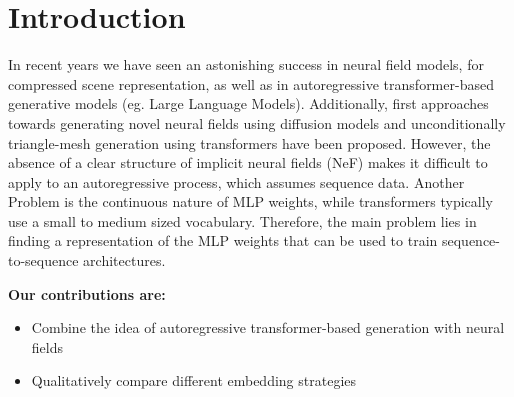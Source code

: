 \section{Introduction}
\label{sec:intro}

In recent years we have seen an astonishing success in neural field models, for compressed scene representation, as well as in autoregressive
transformer-based generative models (eg. Large Language Models).
Additionally, first approaches towards generating novel neural fields using diffusion models \cite{erkoç2023hyperdiffusion} and unconditionally triangle-mesh generation using transformers \cite{siddiqui2023meshgpt} have been proposed.
However, the absence of a clear structure of implicit neural fields (NeF) makes it difficult to apply to an autoregressive process, which assumes sequence data. Another Problem is the continuous nature of MLP weights, while transformers typically use a small to medium sized vocabulary.
Therefore, the main problem lies in finding a representation of the MLP weights that can be used to train sequence-to-sequence architectures.

\noindent \textbf{Our contributions are:}
\begin{itemize}
    \item Combine the idea of autoregressive transformer-based generation with neural fields
    \item Qualitatively compare different embedding strategies
\end{itemize}
